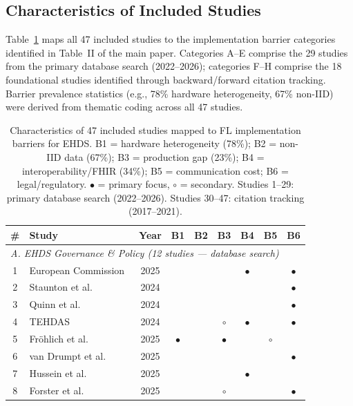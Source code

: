 \documentclass[conference]{IEEEtran}
\begin{document}
\subsection{Characteristics of Included Studies}
\label{sec:included_studies}

Table~\ref{tab:included_studies} maps all 47 included studies to the implementation barrier categories identified in Table~II of the main paper. Categories A--E comprise the 29 studies from the primary database search (2022--2026); categories F--H comprise the 18 foundational studies identified through backward/forward citation tracking. Barrier prevalence statistics (e.g., 78\% hardware heterogeneity, 67\% non-IID) were derived from thematic coding across all 47 studies.

\begin{table}[htbp]
\centering
\caption{Characteristics of 47 included studies mapped to FL implementation barriers for EHDS. B1 = hardware heterogeneity (78\%); B2 = non-IID data (67\%); B3 = production gap (23\%); B4 = interoperability/FHIR (34\%); B5 = communication cost; B6 = legal/regulatory. $\bullet$ = primary focus, $\circ$ = secondary. Studies 1--29: primary database search (2022--2026). Studies 30--47: citation tracking (2017--2021).}
\label{tab:included_studies}
\small
\begin{tabular}{clccccccc}
\toprule
\# & \textbf{Study} & \textbf{Year} & \textbf{B1} & \textbf{B2} & \textbf{B3} & \textbf{B4} & \textbf{B5} & \textbf{B6} \\
\midrule
\multicolumn{9}{l}{\textit{A. EHDS Governance \& Policy (12 studies --- database search)}} \\
\midrule
1 & European Commission~\cite{eu2025ehds} & 2025 & & & & $\bullet$ & & $\bullet$ \\
2 & Staunton et al.~\cite{staunton2024ethical} & 2024 & & & & & & $\bullet$ \\
3 & Quinn et al.~\cite{quinn2024gdpr} & 2024 & & & & & & $\bullet$ \\
4 & TEHDAS~\cite{tehdas2024ready} & 2024 & & & $\circ$ & $\bullet$ & & $\bullet$ \\
5 & Fr\"ohlich et al.~\cite{frohlich2025reality} & 2025 & $\bullet$ & & $\bullet$ & & $\circ$ & \\
6 & van Drumpt et al.~\cite{vandrumpt2025pets} & 2025 & & & & & & $\bullet$ \\
7 & Hussein et al.~\cite{hussein2025interop} & 2025 & & & & $\bullet$ & & \\
8 & Forster et al.~\cite{forster2025journeys} & 2025 & & & $\circ$ & & & $\bullet$ \\

\end{tabular}
\end{table}
\end{document}
